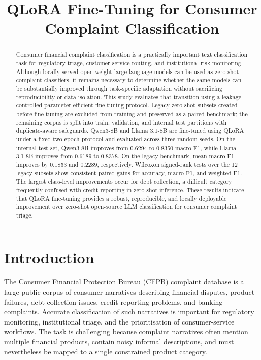 \documentclass{elektr}
\title{QLoRA Fine-Tuning for Consumer Complaint Classification}
\author[Manuscript]{
\rec{}
\acc{}
\finv{}
}
\begin{document}
\maketitle

\begin{abstract}
Consumer financial complaint classification is a practically important text classification task for regulatory triage, customer-service routing, and institutional risk monitoring. Although locally served open-weight large language models can be used as zero-shot complaint classifiers, it remains necessary to determine whether the same models can be substantially improved through task-specific adaptation without sacrificing reproducibility or data isolation. This study evaluates that transition using a leakage-controlled parameter-efficient fine-tuning protocol. Legacy zero-shot subsets created before fine-tuning are excluded from training and preserved as a paired benchmark; the remaining corpus is split into train, validation, and internal test partitions with duplicate-aware safeguards. Qwen3-8B and Llama 3.1-8B are fine-tuned using QLoRA under a fixed two-epoch protocol and evaluated across three random seeds. On the internal test set, Qwen3-8B improves from 0.6294 to 0.8350 macro-F1, while Llama 3.1-8B improves from 0.6189 to 0.8378. On the legacy benchmark, mean macro-F1 improves by 0.1853 and 0.2289, respectively. Wilcoxon signed-rank tests over the 12 legacy subsets show consistent paired gains for accuracy, macro-F1, and weighted F1. The largest class-level improvements occur for debt collection, a difficult category frequently confused with credit reporting in zero-shot inference. These results indicate that QLoRA fine-tuning provides a robust, reproducible, and locally deployable improvement over zero-shot open-source LLM classification for consumer complaint triage.
\end{abstract}

\section{Introduction}

The Consumer Financial Protection Bureau (CFPB) complaint database is a large public corpus of consumer narratives describing financial disputes, product failures, debt collection issues, credit reporting problems, and banking complaints. Accurate classification of such narratives is important for regulatory monitoring, institutional triage, and the prioritisation of consumer-service workflows. The task is challenging because complaint narratives often mention multiple financial products, contain noisy informal descriptions, and must nevertheless be mapped to a single constrained product category.
\end{document}
